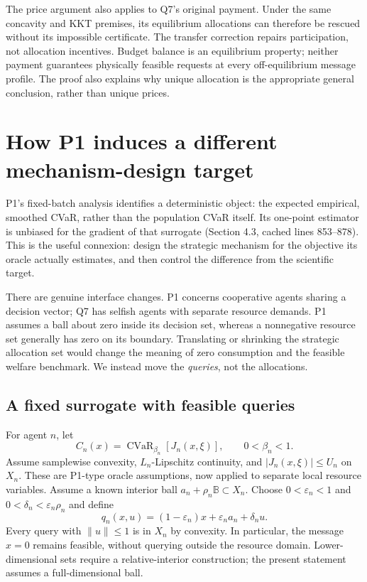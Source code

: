 \documentclass[11pt,a4paper]{article}
\newcommand{\CVaR}{\operatorname{CVaR}}
\begin{document}
The price argument also applies to Q7's original payment. Under the same
concavity and KKT premises, its equilibrium allocations can therefore be
rescued without its impossible certificate. The transfer correction repairs
participation, not allocation incentives. Budget balance is an equilibrium
property; neither payment guarantees physically feasible requests at every
off-equilibrium message profile. The proof also explains why unique
allocation is the appropriate general conclusion, rather than unique prices.

\section{How P1 induces a different mechanism-design target}

P1's fixed-batch analysis identifies a deterministic object: the expected
empirical, smoothed CVaR, rather than the population CVaR itself. Its
one-point estimator is unbiased for the gradient of that surrogate
(Section 4.3, cached lines 853--878). This is the useful connexion:
design the strategic mechanism for the objective its oracle actually
estimates, and then control the difference from the scientific target.

There are genuine interface changes. P1 concerns cooperative agents sharing
a decision vector; Q7 has selfish agents with separate resource demands.
P1 assumes a ball about zero inside its decision set, whereas a nonnegative
resource set generally has zero on its boundary. Translating or shrinking
the strategic allocation set would change the meaning of zero consumption
and the feasible welfare benchmark. We instead move the \emph{queries},
not the allocations.

\subsection{A fixed surrogate with feasible queries}

For agent $n$, let
\begin{equation}
 C_n(x)=\CVaR_{\beta_n}[J_n(x,\xi)],\qquad 0<\beta_n<1.
\end{equation}
Assume samplewise convexity, $L_n$-Lipschitz continuity, and
$|J_n(x,\xi)|\leq U_n$ on $X_n$. These are P1-type oracle assumptions,
now applied to separate local resource variables. Assume a known interior
ball $a_n+\rho_n\mathbb B\subset X_n$. Choose
$0<\varepsilon_n<1$ and $0<\delta_n<\varepsilon_n\rho_n$ and define
\begin{equation}
 q_n(x,u)=(1-\varepsilon_n)x+\varepsilon_na_n+\delta_nu.
 \label{eq:inward}
\end{equation}
Every query with $\|u\|\leq1$ is in $X_n$ by convexity. In particular,
the message $x=0$ remains feasible, without querying outside the resource
domain. Lower-dimensional sets require a relative-interior construction;
the present statement assumes a full-dimensional ball.
\end{document}
